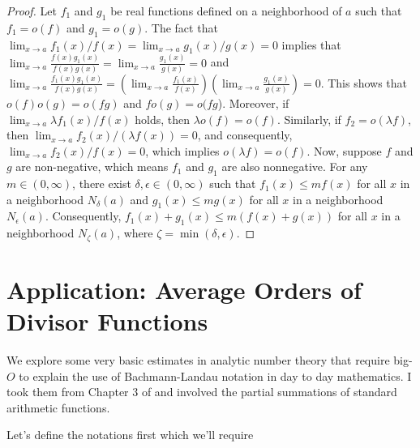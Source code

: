 \documentclass[9pt]{report}
\theoremstyle{definition}
\begin{document}
\begin{proof}
Let \(f_1\) and \(g_1\) be real functions defined on a neighborhood of \(a\) such that \(f_1 = o(f)\) and \(g_1 = o(g)\). The fact that \(\lim_{x\to a} f_1(x)/f(x) = \lim_{x\to a} g_1(x)/g(x) = 0\) implies that \(\lim_{x\to a} \frac{f(x)g_1(x)}{f(x)g(x)} = \lim_{x\to a} \frac{g_1(x)}{g(x)} = 0\) and \(\lim_{x\to a} \frac{f_1(x)g_1(x)}{f(x)g(x)} = \left(\lim_{x\to a} \frac{f_1(x)}{f(x)}\right) \left(\lim_{x\to a} \frac{g_1(x)}{g(x)}\right) = 0\). This shows that \(o(f)o(g)=o(fg)\) and \(fo(g)=o(fg\)). Moreover, if \(\lim_{x\to a} \lambda f_1(x)/f(x)\) holds, then \(\lambda o(f) = o(f)\). Similarly, if \(f_2 = o(\lambda f)\), then \(\lim_{x\to a} f_2(x)/(\lambda f(x)) = 0\), and consequently, \(\lim_{x\to a} f_2(x)/f(x) = 0\), which implies \(o(\lambda f) = o(f)\). Now, suppose \(f\) and \(g\) are non-negative, which means \(f_1\) and \(g_1\) are also nonnegative. For any \(m\in(0,\infty)\), there exist \(\delta,\epsilon\in(0,\infty)\) such that \(f_1(x) \le mf(x)\) for all \(x\) in a neighborhood \(N_{\delta}(a)\) and \(g_1(x) \le mg(x)\) for all \(x\) in a neighborhood \(N_{\epsilon}(a)\). Consequently, \(f_1(x) + g_1(x) \le m(f(x) + g(x))\) for all \(x\) in a neighborhood \(N_{\zeta}(a)\), where \(\zeta = \min(\delta,\epsilon)\).
\end{proof}


\chapter{Application: Average Orders of Divisor Functions}\label{sec:applications}

We explore some very basic estimates in analytic number theory that require big-$O$ to explain the use of Bachmann-Landau notation in day to day mathematics.
I took them from Chapter 3 of \cite{Apostol1976} and involved the partial summations of standard arithmetic functions.

Let's  define the notations first which we'll require
\end{document}
